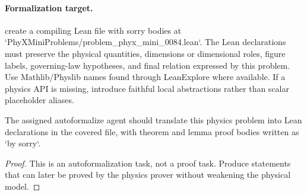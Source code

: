 \paragraph{Formalization target.}
create a compiling Lean file with sorry bodies at `PhyXMiniProblems/problem\_phyx\_mini\_0084.lean`. The Lean declarations must preserve the physical quantities, dimensions or dimensional roles, figure labels, governing-law hypotheses, and final relation expressed by this problem.
Use Mathlib/Physlib names found through LeanExplore where available. If a physics API is missing, introduce faithful local abstractions rather than scalar placeholder aliases.

\begin{theorem}
\label{thm:physics:phyx_mini_0084:target}
The assigned autoformalize agent should translate this physics problem into Lean declarations in the covered file, with theorem and lemma proof bodies written as `by sorry`.
\end{theorem}
\begin{proof}
This is an autoformalization task, not a proof task. Produce statements that can later be proved by the physics prover without weakening the physical model.
\end{proof}

